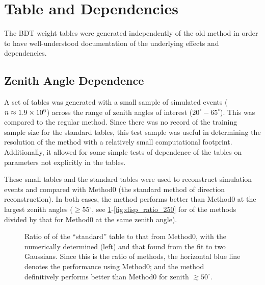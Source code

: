 \documentclass[main.tex]{subfiles}
\begin{document}
\section{\disp Table and \rse Dependencies}
The BDT weight tables were generated independently of the old \disp method in order to have well-understood documentation of the underlying effects and dependencies.

\subsection{Zenith Angle Dependence}
A set of \disp tables was generated with a small sample of simulated events ($n\approx 1.9\times 10^{6}$) across the range of zenith angles of interest ($20^\circ-65^\circ$). This was compared to the regular \disp method. Since there was no record of the training sample size for the standard tables, this test sample was useful in determining the resolution of the \disp method with a relatively small computational footprint. Additionally, it allowed for some simple tests of dependence of the \disp tables on parameters not explicitly in the \disp tables.

These small \disp tables and the standard \disp tables were used to reconstruct simulation events and compared with Method0 (the standard method of direction reconstruction). In both cases, the \disp method performs better than Method0 at the largest zenith angles ($\geq 55^\circ$, see \ref{fig:olddisp_ratio}-\ref{fig:disp_ratio_250} for \rse of the \disp methods divided by that for Method0 at the same zenith angle).

\begin{figure}[H]
  \begin{center}
      \caption[``standard'' \disp table reconstruction.]{Ratio of \rse of the ``standard'' \disp table to that from Method0, with the numerically determined \rse (left) and that found from the fit to two Gaussians. Since this is the ratio of methods, the horizontal blue line denotes the performance using Method0; and the \disp method definitively performs better than Method0 for zenith $\gtrsim50^\circ$.}  
      \label{fig:olddisp_ratio}
  \end{center}
\end{figure}
\end{document}
